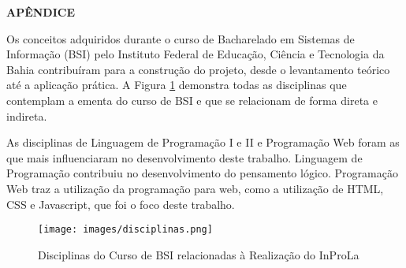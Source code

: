 \documentclass[12pt]{article}
\begin{document}



\newpage

\noindent\textbf{APÊNDICE}

Os conceitos adquiridos durante o curso de Bacharelado em Sistemas de Informação (BSI) pelo Instituto Federal de Educação, Ciência e Tecnologia da Bahia contribuíram para a construção do projeto, desde o levantamento teórico até a aplicação prática. A Figura \ref{fig:disciplinas} demonstra todas as disciplinas que contemplam a ementa do curso de BSI e que se relacionam de forma direta e indireta. 

As disciplinas de Linguagem de Programação I e II e Programação Web foram as que mais influenciaram no desenvolvimento deste trabalho. Linguagem de Programação contribuiu no desenvolvimento do pensamento lógico. Programação Web traz a utilização da programação para web, como a utilização de HTML, CSS e Javascript, que foi o foco deste trabalho.

\begin{figure}[ht]
\centering
\texttt{[image: images/disciplinas.png]}
\caption{Disciplinas do Curso de BSI relacionadas à Realização do InProLa}
\label{fig:disciplinas}
\end{figure}
\end{document}
